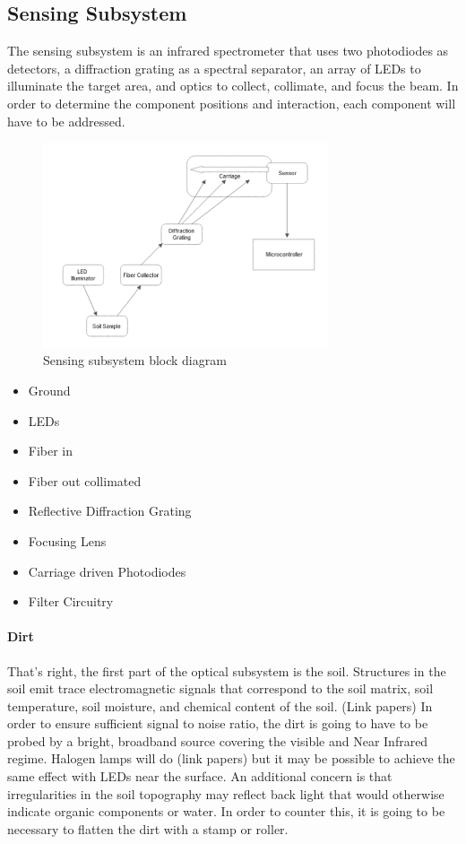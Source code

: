\subsection{Sensing Subsystem}
\label{sec:sensing_subsystem}
The sensing subsystem is an infrared spectrometer that uses two photodiodes as detectors, a diffraction grating as a spectral separator, an array of LEDs to illuminate the target area, and optics to collect, collimate, and focus the beam. In order to determine the component positions and interaction, each component will have to be addressed.
\begin{figure}[H]
    \caption{Sensing subsystem block diagram}
    \centering
    \includegraphics[width=0.75\textwidth]{images/OpticsBlockDiagram.png}
\end{figure}
\begin{itemize}
    \item Ground
    \item LEDs
    \item Fiber in
    \item Fiber out collimated
    \item Reflective Diffraction Grating
    \item Focusing Lens
    \item Carriage driven Photodiodes
    \item Filter Circuitry
\end{itemize}


\paragraph{Dirt}
That’s right, the first part of the optical subsystem is the soil. Structures in the soil emit trace electromagnetic signals that correspond to the soil matrix, soil temperature, soil moisture, and chemical content of the soil. (Link papers)
In order to ensure sufficient signal to noise ratio, the dirt is going to have to be probed by a bright, broadband source covering the visible and Near Infrared regime. Halogen lamps will do (link papers) but it may be possible to achieve the same effect with LEDs near the surface. 
An additional concern is that irregularities in the soil topography may reflect back light that would otherwise indicate organic components or water. In order to counter this, it is going to be necessary to flatten the dirt with a stamp or roller.


